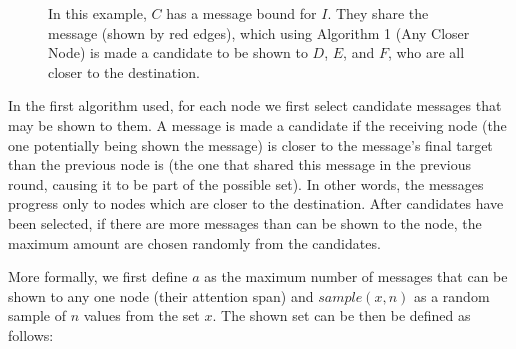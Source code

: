 \documentclass[bsc,frontabs,twoside,singlespacing,parskip,deptreport]{infthesis}     %
\begin{document}
\begin{figure}
\centering
{}
\caption{In this example, $C$ has a message bound for $I$. They share the message (shown by red edges), which using Algorithm 1 (Any Closer Node) is made a candidate to be shown to $D$, $E$, and $F$, who are all closer to the destination.}
\label{fig:alg_1_example}
\end{figure}

In the first algorithm used, for each node we first select candidate messages that may be shown to them. A message is made a candidate if the receiving node (the one potentially being shown the message) is closer to the message's final target than the previous node is (the one that shared this message in the previous round, causing it to be part of the possible set). In other words, the messages progress only to nodes which are closer to the destination. After candidates have been selected, if there are more messages than can be shown to the node, the maximum amount are chosen randomly from the candidates. 

More formally, we first define $a$ as the maximum number of messages that can be shown to any one node (their attention span) and $sample(x, n)$ as a random sample of $n$ values from the set $x$. The shown set can be then be defined as follows:
\end{document}
